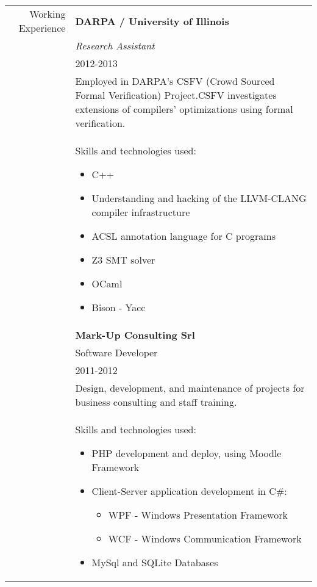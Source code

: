\begin{center}
\begin{singlespace}
\newpage
\begin{tabular}{r@{\hspace{0.2in}}|@{\hspace{0.2in}}p{4.5in}}

{\Large Working Experience}
& \textbf{DARPA / University of Illinois} \\
& \emph{Research Assistant} \\
& 2012-2013 \\
& Employed in DARPA's CSFV (Crowd Sourced Formal Verification) Project.CSFV investigates extensions of compilers' optimizations using formal verification. \\
& Skills and technologies used:
\begin{itemize}
  \item C++
  \item Understanding and hacking of the LLVM-CLANG compiler infrastructure
  \item ACSL annotation language for C programs
  \item Z3 SMT solver
  \item OCaml
  \item Bison - Yacc
\end{itemize}
\\
& \textbf{Mark-Up Consulting Srl} \\
& Software Developer \\
& 2011-2012 \\
& Design, development, and maintenance of projects for business consulting and staff training.\\
& Skills and technologies used:
\begin{itemize}
  \item PHP development and deploy, using Moodle Framework
  \item Client-Server application development in C\#:
  \begin{itemize}
    \item WPF - Windows Presentation Framework
    \item WCF - Windows Communication Framework
  \end{itemize}
  \item MySql and SQLite Databases
\end{itemize}
\\
\end{tabular}
\end{singlespace}
\end{center}
